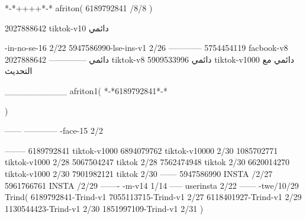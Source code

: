 *-*++++*-*
afriton(
6189792841 /8/8
)

2027888642 tiktok-v10
دائمي

-in-no-se-16 2/22
5947586990-lse-ins-v1 2/26
------------
5754454119 facbook-v8
دائمي
--------------
2027888642 tiktok-v8
دائمي
5909533996 tiktok-v1000
دائمي مع التحديث

__________
afriton1(
*-*6189792841*-*

)


------
------------
-face-15 2/2

--------
6189792841 tiktok-v1000
6894079762 tiktok-v10000 2/30
1085702771 tiktok-v1000 2/28
5067504247 tiktok 2/28
7562474948 tiktok 2/30
6620014270 tiktok-v1000 2/30
7901982121 tiktok 2/30
------
5947586990 INSTA /2/27
5961766761 INSTA /2/29
-------
-m-v14 1/14
-----
userinsta 2/22
------
-twe/10/29
Trind(
6189792841-Trind-v1 
7055113715-Trind-v1 2/27
6118401927-Trind-v1 2/29
1130544423-Trind-v1 2/30
1851997109-Trind-v1 2/31
)
